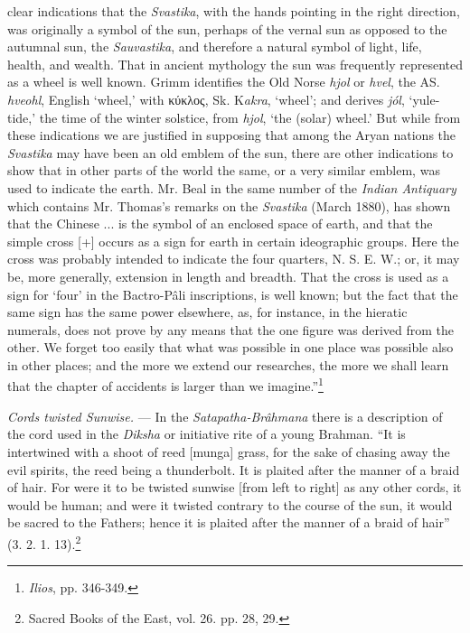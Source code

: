 \documentclass[a4paper, 11pt, oneside, polutonikogreek, english]{article}
\begin{document}
clear indications that the \emph{Svastika}, with the hands pointing in the right direction, was originally a symbol of the sun, perhaps of the vernal sun as opposed to the autumnal sun, the \emph{Sauvastika}, and therefore a natural symbol of light, life, health, and wealth. That in ancient mythology the sun was frequently represented as a wheel is well known. Grimm identifies the Old Norse \emph{hjol} or \emph{hvel}, the AS. \emph{hveohl}, English `wheel,' with κύκλος, Sk. K\emph{akra}, `wheel'; and derives \emph{jól}, `yule-tide,' the time of the winter solstice, from \emph{hjol}, `the (solar) wheel.' But while from these indications we are justified in supposing that among the Aryan nations the \emph{Svastika} may have been an old emblem of the sun, there are other indications to show that in other parts of the world the same, or a very similar emblem, was used to indicate the earth. Mr. Beal in the same number of the \emph{Indian Antiquary} which contains Mr. Thomas's remarks on the \emph{Svastika} (March 1880), has shown that the Chinese ... is the symbol of an enclosed space of earth, and that the simple cross [+] occurs as a sign for earth in certain ideographic groups. Here the cross was probably intended to indicate the four quarters, N. S. E. W.; or, it may be, more generally, extension in length and breadth. That the cross is used as a sign for `four' in the Bactro-Pâli inscriptions, is well known; but the fact that the same sign has the same power elsewhere, as, for instance, in the hieratic numerals, does not prove by any means that the one figure was derived from the other. We forget too easily that what was possible in one place was possible also in other places; and the more we extend our researches, the more we shall learn that the chapter of accidents is larger than we imagine.''\footnote{\emph{Ilios}, pp. 346-349.}

\emph{Cords twisted Sunwise.} --- In the \emph{Satapatha-Brâhmana} there is a description of the cord used in the \emph{Diksha} or initiative rite of a young Brahman. ``It is intertwined with a shoot of reed [munga] grass, for the sake of chasing away the evil spirits, the reed being a thunderbolt. It is plaited after the manner of a braid of hair. For were it to be twisted sunwise [from left to right] as any other cords, it would be human; and were it twisted contrary to the course of the sun, it would be sacred to the Fathers; hence it is plaited after the manner of a braid of hair'' (3. 2. 1. 13).\footnote{Sacred Books of the East, vol. 26. pp. 28, 29.}
\end{document}
